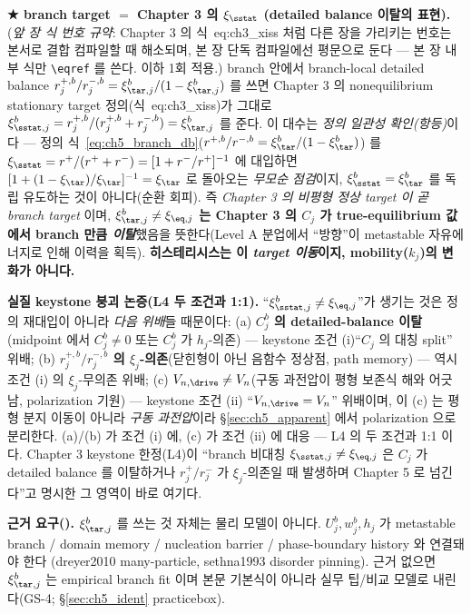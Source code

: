 \begin{keybox}
\textbf{★ branch target $=$ Chapter 3 의 $\xi_{\sstat}$ (detailed balance 이탈의 표현).} (\emph{앞 장 식 번호
규약}: Chapter 3 의 식~eq:ch3\_xiss 처럼 다른 장을 가리키는 번호는 본서로 결합 컴파일할 때 해소되며, 본 장 단독
컴파일에선 평문으로 둔다 — 본 장 내부 식만 \texttt{\textbackslash eqref} 를 쓴다. 이하 1회 적용.) branch 안에서 branch-local detailed
balance $r_j^{+,b}/r_j^{-,b}=\xi_{\tar,j}^b/(1-\xi_{\tar,j}^b)$ 를 쓰면 Chapter 3 의 nonequilibrium stationary
target 정의(식~eq:ch3\_xiss)가 그대로 $\xi_{\sstat,j}^b=r_j^{+,b}/(r_j^{+,b}+r_j^{-,b})=\xi_{\tar,j}^b$ 를 준다.
이 대수는 \emph{정의 일관성 확인(항등)}이다 — 정의 식~\eqref{eq:ch5_branch_db}($r^{+,b}/r^{-,b}=\xi_\tar^b/(1-\xi_\tar^b)$)
를 $\xi_{\sstat}=r^+/(r^++r^-)=[1+r^-/r^+]^{-1}$ 에 대입하면 $[1+(1-\xi_\tar)/\xi_\tar]^{-1}=\xi_\tar$ 로 돌아오는
\emph{무모순 점검}이지, $\xi_{\sstat}^b=\xi_\tar^b$ 를 독립 유도하는 것이 아니다(순환 회피). 즉 \emph{Chapter 3 의
비평형 정상 target 이 곧 branch target} 이며, \textbf{$\xi_{\tar,j}^b\ne\xi_{\eq,j}$ 는 Chapter 3 의 $C_j$ 가
true-equilibrium 값에서 branch 만큼 \emph{이탈}}했음을 뜻한다(Level A 분업에서 ``방향''이 metastable 자유에너지로
인해 이력을 획득). \textbf{히스테리시스는 이 \emph{target 이동}이지, mobility($k_j$)의 변화가 아니다.}

\textbf{실질 keystone 붕괴 논증(L4 두 조건과 1:1).} ``$\xi_{\sstat,j}^b\ne\xi_{\eq,j}$''가 생기는 것은 정의
재대입이 아니라 \emph{다음 위배}들 때문이다: (a) \textbf{$C_j^b$ 의 detailed-balance 이탈}(midpoint 에서 $C_j^b\ne0$
또는 $C_j^b$ 가 $h_j$-의존) — keystone 조건 (i)``$C_j$ 의 대칭 split'' 위배; (b) \textbf{$r_j^{+,b}/r_j^{-,b}$ 의
$\xi_j$-의존}(닫힌형이 아닌 음함수 정상점, path memory) — 역시 조건 (i) 의 $\xi_j$-무의존 위배; (c)
\textbf{$V_{n,\drive}\ne V_n$}(구동 과전압이 평형 보존식 해와 어긋남, polarization 기원) — keystone 조건 (ii)
``$V_{n,\drive}=V_n$'' 위배이며, 이 (c) 는 평형 분지 이동이 아니라 \emph{구동 과전압}이라 \S\ref{sec:ch5_apparent}
에서 polarization 으로 분리한다. (a)/(b) 가 조건 (i) 에, (c) 가 조건 (ii) 에 대응 — L4 의 두 조건과 1:1 이다.
Chapter 3 keystone 한정(L4)이 ``branch 비대칭 $\xi_{\sstat,j}\ne\xi_{\eq,j}$ 은 $C_j$ 가 detailed balance 를
이탈하거나 $r_j^+/r_j^-$ 가 $\xi_j$-의존일 때 발생하며 Chapter 5 로 넘긴다''고 명시한 그 영역이 바로 여기다.
\end{keybox}
\begin{boundbox}
\textbf{근거 요구().} $\xi_{\tar,j}^b$ 를 쓰는 것 자체는 물리 모델이 아니다. $U_j^b,w_j^b,h_j$ 가
metastable branch / domain memory / nucleation barrier / phase-boundary history 와 연결돼야 한다
(dreyer2010 many-particle, sethna1993 disorder pinning). 근거 없으면 $\xi_{\tar,j}^b$ 는 empirical branch
fit 이며 본문 기본식이 아니라 실무 팁/비교 모델로 내린다(GS-4; \S\ref{sec:ch5_ident} practicebox).
\end{boundbox}

